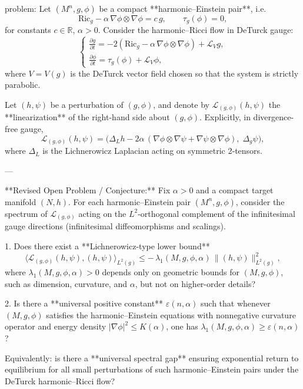 problem:  
Let \((M^n,g,\phi)\) be a compact **harmonic–Einstein pair**, i.e.  
\[
\mathrm{Ric}_g - \alpha\,\nabla\phi\otimes \nabla\phi = c\,g, \qquad \tau_g(\phi)=0,
\]
for constants \(c\in \mathbb{R}\), \(\alpha>0\).  
Consider the harmonic–Ricci flow in DeTurck gauge:
\[
\begin{cases}
\frac{\partial g}{\partial t} = -2(\mathrm{Ric}_g - \alpha\,\nabla\phi\otimes\nabla\phi)+\mathcal{L}_V g,\\[4pt]
\frac{\partial \phi}{\partial t} = \tau_g(\phi)+\mathcal{L}_V\phi,
\end{cases}
\]
where \(V=V(g)\) is the DeTurck vector field chosen so that the system is strictly parabolic.

Let \((h,\psi)\) be a perturbation of \((g,\phi)\), and denote by  
\(\mathcal{L}_{(g,\phi)}(h,\psi)\) the **linearization** of the right-hand side about \((g,\phi)\). Explicitly, in divergence-free gauge,
\[
\mathcal{L}_{(g,\phi)}(h,\psi)
=\Big(\Delta_L h - 2\alpha\,(\nabla\phi\otimes\nabla\psi + \nabla\psi\otimes\nabla\phi),\; \Delta_g \psi \Big),
\]
where \(\Delta_L\) is the Lichnerowicz Laplacian acting on symmetric 2‑tensors.

---

**Revised Open Problem / Conjecture:**  
Fix \(\alpha>0\) and a compact target manifold \((N,h)\).  
For each harmonic–Einstein pair \((M^n,g,\phi)\), consider the spectrum of \(\mathcal{L}_{(g,\phi)}\) acting on the \(L^2\)-orthogonal complement of the infinitesimal gauge directions (infinitesimal diffeomorphisms and scalings).

1. Does there exist a **Lichnerowicz-type lower bound**
   \[
   \langle \mathcal{L}_{(g,\phi)}(h,\psi), (h,\psi) \rangle_{L^2(g)} \le -\,\lambda_1(M,g,\phi,\alpha)\,\|(h,\psi)\|_{L^2(g)}^2,
   \]
   where \(\lambda_1(M,g,\phi,\alpha)>0\) depends only on geometric bounds for \((M,g,\phi)\), such as dimension, curvature, and \(\alpha\), but not on higher-order details?  

2. Is there a **universal positive constant** \(\varepsilon(n,\alpha)\) such that whenever \((M,g,\phi)\) satisfies the harmonic–Einstein equations with nonnegative curvature operator and energy density \(|\nabla\phi|^2\le K(\alpha)\), one has \(\lambda_1(M,g,\phi,\alpha)\ge \varepsilon(n,\alpha)\)?  

Equivalently: is there a **universal spectral gap** ensuring exponential return to equilibrium for all small perturbations of such harmonic–Einstein pairs under the DeTurck harmonic–Ricci flow?

